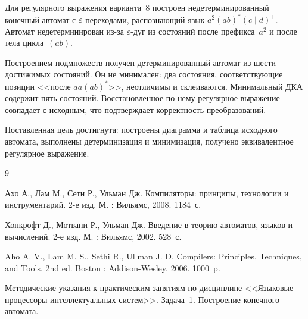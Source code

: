 
Для регулярного выражения варианта~8 построен недетерминированный конечный автомат с $\varepsilon$-переходами, распознающий язык $a^{2}(ab)^{*}(c\mid d)^{+}$. Автомат недетерминирован из-за $\varepsilon$-дуг из состояний после префикса~$a^{2}$ и после тела цикла~$(ab)$.

Построением подмножеств получен детерминированный автомат из шести достижимых состояний. Он не минимален: два состояния, соответствующие позиции <<после $aa(ab)^{*}$>>, неотличимы и склеиваются. Минимальный ДКА содержит пять состояний. Восстановленное по нему регулярное выражение совпадает с исходным, что подтверждает корректность преобразований.

Поставленная цель достигнута: построены диаграмма и таблица исходного автомата, выполнены детерминизация и минимизация, получено эквивалентное регулярное выражение.

\begin{thebibliography}{9}

	Ахо А., Лам М., Сети Р., Ульман Дж. Компиляторы: принципы, технологии и инструментарий. \mdash{} 2-е изд. \mdash{} М. : Вильямс, 2008. \mdash{} 1184~с.

	Хопкрофт Д., Мотвани Р., Ульман Дж. Введение в теорию автоматов, языков и вычислений. \mdash{} 2-е изд. \mdash{} М. : Вильямс, 2002. \mdash{} 528~с.

	Aho A. V., Lam M. S., Sethi R., Ullman J. D. Compilers: Principles, Techniques, and Tools. \mdash{} 2nd ed. \mdash{} Boston : Addison-Wesley, 2006. \mdash{} 1000~p.

	Методические указания к практическим занятиям по дисциплине <<Языковые процессоры интеллектуальных систем>>. Задача~1. Построение конечного автомата.
\end{thebibliography}

